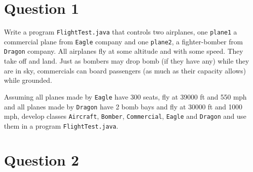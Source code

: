 %
%
%
%

\section*{Question 1}

Write a program \texttt{FlightTest.java} that controls two airplanes, one \texttt{plane1} a commercial plane from \texttt{Eagle} company and one \texttt{plane2}, a fighter-bomber from \texttt{Dragon} company.  All airplanes fly at some altitude and with some speed. They take off and land. Just as bombers may drop bomb (if they have any) while they are in sky, commercials can board passengers (as much as their capacity allows) while grounded.

Assuming all planes made by \texttt{Eagle} have 300 seats, fly at 39000 ft and 550 mph and all planes made by \texttt{Dragon} have 2 bomb bays and fly at 30000 ft and 1000 mph, develop classes \texttt{Aircraft}, \texttt{Bomber}, \texttt{Commercial}, \texttt{Eagle} and \texttt{Dragon} and use them in a program \texttt{FlightTest.java}.

\section*{Question 2}

